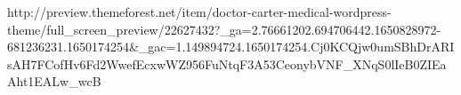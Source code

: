 http://preview.themeforest.net/item/doctor-carter-medical-wordpress-theme/full_screen_preview/22627432?_ga=2.76661202.694706442.1650828972-681236231.1650174254&_gac=1.149894724.1650174254.Cj0KCQjw0umSBhDrARIsAH7FCofHv6Fd2WwefEcxwWZ956FuNtqF3A53CeonybVNF_XNqS0lIeB0ZIEaAht1EALw_wcB